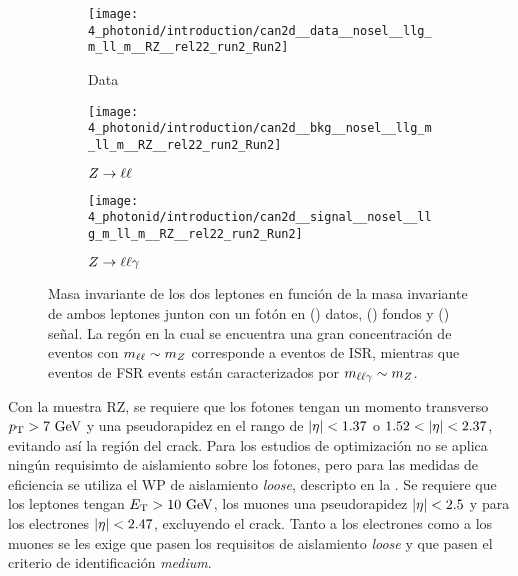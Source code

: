 \begin{figure}[ht!]
    \centering
    \begin{subfigure}[h]{0.32\linewidth}
        \centering
        \texttt{[image: 4\_photonid/introduction/can2d\_\_data\_\_nosel\_\_llg\_m\_ll\_m\_\_RZ\_\_rel22\_run2\_Run2]}
        \caption{Data}
        \label{fig:pid_ss:event_selection:mll_mlly_distribution:data}
    \end{subfigure}
    \hfill
    \begin{subfigure}[h]{0.32\linewidth}
        \centering
        \texttt{[image: 4\_photonid/introduction/can2d\_\_bkg\_\_nosel\_\_llg\_m\_ll\_m\_\_RZ\_\_rel22\_run2\_Run2]}
        \caption{\(Z\rightarrow \ell\ell\)}
        \label{fig:pid_ss:event_selection:mll_mlly_distribution:bkg}
    \end{subfigure}
    \hfill
    \begin{subfigure}[h]{0.32\linewidth}
        \centering
        \texttt{[image: 4\_photonid/introduction/can2d\_\_signal\_\_nosel\_\_llg\_m\_ll\_m\_\_RZ\_\_rel22\_run2\_Run2]}
        \caption{\(Z\rightarrow \ell\ell\gamma\)}
        \label{fig:pid_ss:event_selection:mll_mlly_distribution:signal}
    \end{subfigure}
    \caption{Masa invariante de los dos leptones en funci\'on de la masa invariante de ambos leptones junton con un fot\'on en () datos, () fondos y () se\~nal. La reg\'on en la cual se encuentra una gran concentraci\'on de eventos con \(m_{\ell\ell} \sim m_{Z}\) corresponde a eventos de \ac{ISR}, mientras que eventos de \ac{FSR} events est\'an caracterizados por \(m_{\ell\ell\gamma} \sim m_{Z}\).}
    \label{fig:pid_ss:event_selection:mll_mlly_distribution}
\end{figure}

Con la muestra \ac{RZ}, se requiere que los fotones tengan un momento transverso \(p_{\text{T}}>7~\text{GeV}\) y una pseudorapidez en el rango de \(|\eta|<1.37\) o \(1.52<\abseta<2.37\), evitando as\'i la región del crack.
Para los estudios de optimización no se aplica ningún requisimto de aislamiento sobre los fotones, pero para las medidas de eficiencia se utiliza el \ac{WP} de aislamiento \textit{loose}, descripto en la \Sect{\ref{subsec:objects:egamma:iso}}. Se requiere que los leptones tengan \(E_{\text{T}}>10~\text{GeV}\), los muones una pseudorapidez \(|\eta|<2.5\) y para los electrones \(|\eta|<2.47\), excluyendo el crack. Tanto a los electrones como a los muones se les exige que pasen los requisitos de aislamiento \textit{loose} y que pasen el criterio de identificación \textit{medium}.

